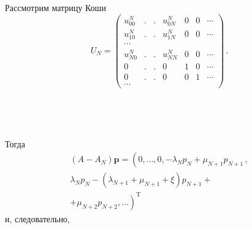 \begin{multicols}{2}
Рассмотрим матрицу Коши
\begin{equation*}
U_N =\begin{pmatrix}
  u_{00}^N & . & . & u_{0N}^N  & 0 & 0 & \cdots \\
u_{10}^N & . & . & u_{1N}^N  & 0 & 0 & \cdots \\
\cdots \\
u_{N0}^N & . & . & u_{NN}^N  & 0 & 0 & \cdots \\
0 & . & . & 0 & 1 & 0 & \cdots \\
0 & . & . & 0 & 0 & 1 & \cdots \\
\cdots
\end{pmatrix}\,.
\end{equation*}
\begin{figure*}[b] %
\vspace*{1pt}
\begin{minipage}[t]{80mm}
\begin{center}
\mbox{%
\epsfxsize=78.547mm %
}
\end{center}
\vspace*{-9pt}
\end{minipage}
\hfill
\vspace*{1pt}
\begin{minipage}[t]{80mm}
\begin{center}
\mbox{%
\epsfxsize=77.25mm %
}
\end{center}
\vspace*{-9pt}
\end{minipage}
\end{figure*}

\noindent
Тогда
\begin{multline*}
\left(A -A_N\right) {\mathbf p} = \left(0,\dots,0,-\lambda_Np_N +
\mu_{N+1}p_{N+1}\,,\right.\\
\left.\lambda_Np_N - \left(\lambda_{N+1} + \mu_{N+1}+\xi
\right)p_{N+1} + {}\right.\\
{}\left. +\mu_{N+2}p_{N+2},\dots \right)^{\mathrm{T}}
\end{multline*}
и, следовательно,


\end{multicols}
